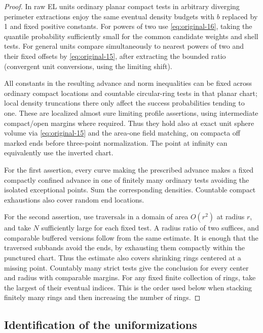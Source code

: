 \begin{proof}
In raw EL units ordinary planar compact tests in arbitrary diverging perimeter extractions enjoy the
same eventual density budgets with \(b\) replaced by 1 and fixed positive constants. For powers of
two use \eqref{eq:original-16}, taking the quantile probability sufficiently small for the common
candidate weights and shell tests. For general units compare simultaneously to nearest powers of two
and their fixed offsets by \eqref{eq:original-15}, after extracting the bounded ratio (convergent
unit conversions, using the limiting shift).

All constants in the resulting advance and norm inequalities can be fixed across ordinary compact
locations and countable circular-ring tests in that planar chart; local density truncations there
only affect the success probabilities tending to one. These are localized almost sure limiting
profile assertions, using intermediate compact/open margins where required. Thus they hold also at
exact unit sphere volume via \eqref{eq:original-15} and the area-one field matching, on compacta off
marked ends before three-point normalization. The point at infinity can equivalently use the
inverted chart.

For the first assertion, every curve making the prescribed advance makes a fixed compactly
confined advance in one of finitely many ordinary tests avoiding the isolated exceptional
points. Sum the corresponding densities. Countable compact exhaustions also cover random end
locations.

For the second assertion, use traversals in a domain of area \(O(r^2)\) at radius \(r\), and take
\(N\) sufficiently large for each fixed test. A radius ratio of two suffices, and comparable
buffered versions follow from the same estimate. It is enough that the traversed subbands avoid
the ends, by exhausting them compactly within the punctured chart. Thus the estimate also covers
shrinking rings centered at a missing point. Countably many strict tests give the conclusion
for every center and radius with comparable margins. For any fixed finite
collection of rings, take the largest of their eventual indices. This is
the order used below when stacking finitely many rings and then increasing
the number of rings.
\end{proof}

\subsection{Identification of the uniformizations}

